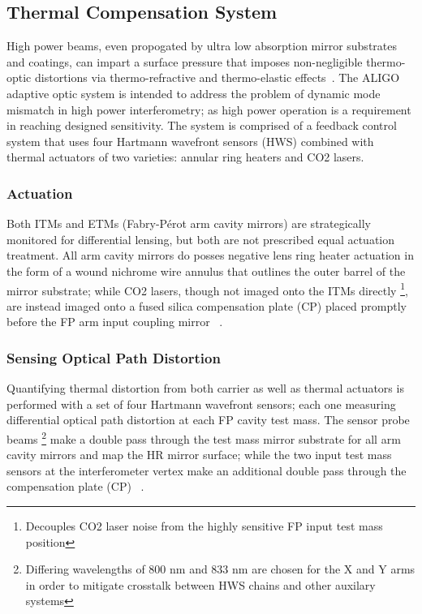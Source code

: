\subsection{Thermal Compensation System}
High power beams, even propogated by ultra low absorption mirror substrates and coatings, can impart a surface pressure that imposes non-negligible thermo-optic distortions via thermo-refractive and thermo-elastic effects~\cite{hellovinet:1990}. The ALIGO adaptive optic system is intended to address the problem of dynamic mode mismatch in high power interferometry; as high power operation is a requirement in reaching designed sensitivity. The system is comprised of a feedback control system that uses four Hartmann wavefront sensors (HWS) combined with thermal actuators of two varieties: annular ring heaters and CO2 lasers. 

\subsubsection{Actuation}
Both ITMs and ETMs (Fabry-P\'{e}rot arm cavity mirrors) are strategically monitored for differential lensing, but both are not prescribed equal actuation treatment. All arm cavity mirrors do posses negative lens ring heater actuation in the form of a wound nichrome wire annulus that outlines the outer barrel of the mirror substrate; while CO2 lasers, though not imaged onto the ITMs directly \footnote{Decouples CO2 laser noise from the highly sensitive FP input test mass position}, are instead imaged onto a fused silica compensation plate (CP) placed promptly before the FP arm input coupling mirror ~\cite{brooks:aigwd2019}.

\subsubsection{Sensing Optical Path Distortion}
Quantifying thermal distortion from both carrier as well as thermal actuators is performed with a set of four Hartmann wavefront sensors; each one measuring differential optical path distortion at each FP cavity test mass. The sensor probe beams \footnote{Differing wavelengths of 800 nm and 833 nm are chosen for the X and Y arms in order to mitigate crosstalk between HWS chains and other auxilary systems} make a double pass through the test mass mirror substrate for all arm cavity mirrors and map the HR mirror surface; while the two input test mass sensors at the interferometer vertex make an additional double pass through the compensation plate (CP) ~\cite{aasi:2015}.


